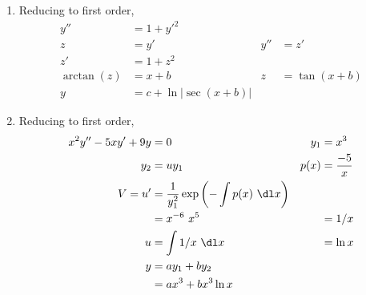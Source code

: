 \begin{enumerate}
    \item Reducing to first order,
          \begin{align}
              y''        & = 1 + y'^{2}                                   \\
              z          & = y'                     & y'' & = z'          \\
              z'         & = 1 + z^{2}                                    \\
              \arctan(z) & = x + b                  & z   & = \tan(x + b) \\
              y          & = c + \ln |\sec (x + b)|
          \end{align}

    \item Reducing to first order,
          \begin{align}
              x^{2}y'' - 5xy' + 9y & = 0                                         &
              y_{1}                & = x^{3}                                       \\
              y_{2}                & = uy_{1}                                    &
              p(x)                 & = \frac{-5}{x}                                \\
              V = u'               & = \frac{1}{y_{1}^{2}} \exp\left( -\int p(x)
              \ \dl x \right)                                                      \\
                                   & = x^{-6}\ x^{5}                             &
                                   & = 1/x                                         \\
              u                    & = \int 1/x\ \dl x                           &
                                   & = \ln x                                       \\
              y                    & = ay_{1} + by_{2}                             \\
                                   & = ax^{3} + bx^{3}\ln x
          \end{align}


\end{enumerate}

